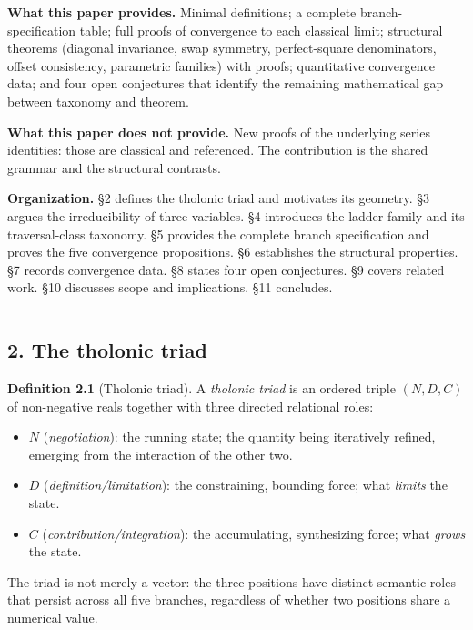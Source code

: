 \documentclass[
  11pt,
  letterpaper,
]{article}
\providecommand{\tightlist}{%
  \setlength{\itemsep}{0pt}\setlength{\parskip}{0pt}}
\begin{document}
\textbf{What this paper provides.} Minimal definitions; a complete
branch-specification table; full proofs of convergence to each classical
limit; structural theorems (diagonal invariance, swap symmetry,
perfect-square denominators, offset consistency, parametric families)
with proofs; quantitative convergence data; and four open conjectures
that identify the remaining mathematical gap between taxonomy and
theorem.

\textbf{What this paper does not provide.} New proofs of the underlying
series identities: those are classical and referenced. The contribution
is the shared grammar and the structural contrasts.

\textbf{Organization.} §2 defines the tholonic triad and motivates its
geometry. §3 argues the irreducibility of three variables. §4 introduces
the ladder family and its traversal-class taxonomy. §5 provides the
complete branch specification and proves the five convergence
propositions. §6 establishes the structural properties. §7 records
convergence data. §8 states four open conjectures. §9 covers related
work. §10 discusses scope and implications. §11 concludes.

\begin{center}\rule{0.5\linewidth}{0.5pt}\end{center}

\subsection{2. The tholonic triad}\label{the-tholonic-triad}

\textbf{Definition 2.1} (Tholonic triad). A \emph{tholonic triad} is an
ordered triple \((N, D, C)\) of non-negative reals together with three
directed relational roles:

\begin{itemize}
\tightlist
\item
  \(N\) (\emph{negotiation}): the running state; the quantity being
  iteratively refined, emerging from the interaction of the other two.
\item
  \(D\) (\emph{definition/limitation}): the constraining, bounding
  force; what \emph{limits} the state.
\item
  \(C\) (\emph{contribution/integration}): the accumulating,
  synthesizing force; what \emph{grows} the state.
\end{itemize}

The triad is not merely a vector: the three positions have distinct
semantic roles that persist across all five branches, regardless of
whether two positions share a numerical value.
\end{document}
